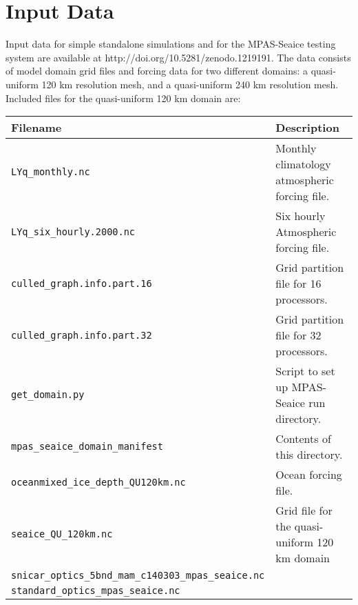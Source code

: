 \section{Input Data}
\label{sec:input_data}

Input data for simple standalone simulations and for the MPAS-Seaice testing system are available at http://doi.org/10.5281/zenodo.1219191. The data consists of model domain grid files and forcing data for two different domains: a quasi-uniform 120 km resolution mesh, and a quasi-uniform 240 km resolution mesh. Included files for the quasi-uniform 120 km domain are:

\begin{table}[H]
\begin{tabular}{ll}
\hline
Filename & Description \\
\hline
\lstinline+LYq_monthly.nc+ & Monthly climatology atmospheric forcing file. \\
\lstinline+LYq_six_hourly.2000.nc+ & Six hourly Atmospheric forcing file. \\
\lstinline+culled_graph.info.part.16+ & Grid partition file for 16 processors. \\
\lstinline+culled_graph.info.part.32+ & Grid partition file for 32 processors. \\
\lstinline+get_domain.py+ & Script to set up MPAS-Seaice run directory. \\
\lstinline+mpas_seaice_domain_manifest+ & Contents of this directory. \\
\lstinline+oceanmixed_ice_depth_QU120km.nc+ & Ocean forcing file. \\
\lstinline+seaice_QU_120km.nc+ & Grid file for the quasi-uniform 120 km domain \\
\lstinline+snicar_optics_5bnd_mam_c140303_mpas_seaice.nc+ &  \\
\lstinline+standard_optics_mpas_seaice.nc+ &  \\
\hline
\end{tabular}
\end{table}
